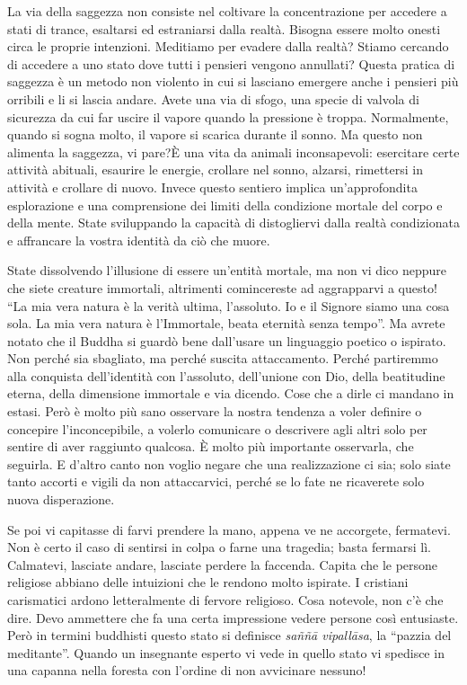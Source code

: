 La via della saggezza non consiste nel coltivare la concentrazione per
accedere a stati di trance, esaltarsi ed estraniarsi dalla realtà.
Bisogna essere molto onesti circa le proprie intenzioni. Meditiamo per
evadere dalla realtà? Stiamo cercando di accedere a uno stato dove tutti
i pensieri vengono annullati? Questa pratica di saggezza è un metodo non
violento in cui si lasciano emergere anche i pensieri più orribili e li
si lascia andare. Avete una via di sfogo, una specie di valvola di
sicurezza da cui far uscire il vapore quando la pressione è troppa.
Normalmente, quando si sogna molto, il vapore si scarica durante il
sonno. Ma questo non alimenta la saggezza, vi pare?È una vita da
animali inconsapevoli: esercitare certe attività abituali, esaurire le
energie, crollare nel sonno, alzarsi, rimettersi in attività e crollare
di nuovo. Invece questo sentiero implica un'approfondita esplorazione e
una comprensione dei limiti della condizione mortale del corpo e della
mente. State sviluppando la capacità di distogliervi dalla realtà
condizionata e affrancare la vostra identità da ciò che muore.

State dissolvendo l'illusione di essere un'entità mortale, ma non vi
dico neppure che siete creature immortali, altrimenti comincereste ad
aggrapparvi a questo! ``La mia vera natura è la verità ultima,
l'assoluto. Io e il Signore siamo una cosa sola. La mia vera natura è
l'Immortale, beata eternità senza tempo''. Ma avrete notato che il Buddha
si guardò bene dall'usare un linguaggio poetico o ispirato. Non perché
sia sbagliato, ma perché suscita attaccamento. Perché partiremmo alla
conquista dell'identità con l'assoluto, dell'unione con Dio, della
beatitudine eterna, della dimensione immortale e via dicendo. Cose che a
dirle ci mandano in estasi. Però è molto più sano osservare la nostra
tendenza a voler definire o concepire l'inconcepibile, a volerlo
comunicare o descrivere agli altri solo per sentire di aver raggiunto
qualcosa. È molto più importante osservarla, che seguirla. E d'altro
canto non voglio negare che una realizzazione ci sia; solo siate tanto
accorti e vigili da non attaccarvici, perché se lo fate ne ricaverete
solo nuova disperazione.

Se poi vi capitasse di farvi prendere la mano, appena ve ne accorgete,
fermatevi. Non è certo il caso di sentirsi in colpa o farne una
tragedia; basta fermarsi lì. Calmatevi, lasciate andare, lasciate
perdere la faccenda. Capita che le persone religiose abbiano delle
intuizioni che le rendono molto ispirate. I cristiani carismatici ardono
letteralmente di fervore religioso. Cosa notevole, non c'è che dire.
Devo ammettere che fa una certa impressione vedere persone così
entusiaste. Però in termini buddhisti questo stato si definisce \textit{saññā vipallāsa},
la ``pazzia del meditante''. Quando un insegnante esperto vi
vede in quello stato vi spedisce in una capanna nella foresta con
l'ordine di non avvicinare nessuno!


